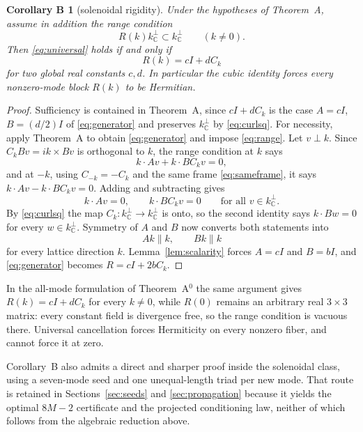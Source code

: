 \documentclass[11pt]{article}
\theoremstyle{definition}
\theoremstyle{remark}
\theoremstyle{plain}
\newtheorem*{corB}{Corollary B}
\newcommand{\C}{\mathbb{C}}
\newcommand{\Ck}{C_k}
\newcommand{\kperp}{k_{\C}^{\perp}}
\begin{document}
\begin{corB}[solenoidal rigidity]
\label{cor:B}
Under the hypotheses of Theorem~A, assume in addition the range condition
\begin{equation}
\label{eq:range}
R(k)\kperp\subset\kperp
\qquad(k\ne0).
\end{equation}
Then \eqref{eq:universal} holds if and only if
\begin{equation}
\label{eq:scalarform}
R(k)=cI+d\Ck
\end{equation}
for two global real constants $c,d$. In particular the cubic identity forces
every nonzero-mode block $R(k)$ to be Hermitian.
\end{corB}

\begin{proof}
Sufficiency is contained in Theorem~A, since $cI+d\Ck$ is the case
$A=cI$, $B=(d/2)I$ of \eqref{eq:generator} and preserves $\kperp$ by
\eqref{eq:curlsq}. For necessity, apply Theorem~A to obtain
\eqref{eq:generator} and impose \eqref{eq:range}. Let $v\perp k$. Since
$\Ck Bv=ik\times Bv$ is orthogonal to $k$, the range condition at $k$ says
\[
k\cdot Av+k\cdot B\Ck v=0 ,
\]
and at $-k$, using $C_{-k}=-\Ck$ and the same frame \eqref{eq:sameframe}, it
says $k\cdot Av-k\cdot B\Ck v=0$. Adding and subtracting gives
\[
k\cdot Av=0,
\qquad
k\cdot B\Ck v=0
\qquad\text{for all }v\in\kperp .
\]
By \eqref{eq:curlsq} the map $\Ck:\kperp\to\kperp$ is onto, so the second
identity says $k\cdot Bw=0$ for every $w\in\kperp$. Symmetry of $A$ and $B$
now converts both statements into
\[
Ak\parallel k,
\qquad
Bk\parallel k
\]
for every lattice direction $k$. Lemma~\ref{lem:scalarity} forces $A=cI$ and
$B=bI$, and \eqref{eq:generator} becomes $R=cI+2b\Ck$.
\end{proof}

In the all-mode formulation of Theorem~A$^{0}$ the same argument gives
$R(k)=cI+d\Ck$ for every $k\ne0$, while $R(0)$ remains an arbitrary real
$3\times3$ matrix: every constant field is divergence free, so the range
condition is vacuous there. Universal cancellation forces Hermiticity on every
nonzero fiber, and cannot force it at zero.

Corollary~B also admits a direct and sharper proof inside the solenoidal
class, using a seven-mode seed and one unequal-length triad per new mode. That
route is retained in Sections~\ref{sec:seeds} and \ref{sec:propagation}
because it yields the optimal $8M-2$ certificate and the projected
conditioning law, neither of which follows from the algebraic reduction above.
\end{document}
